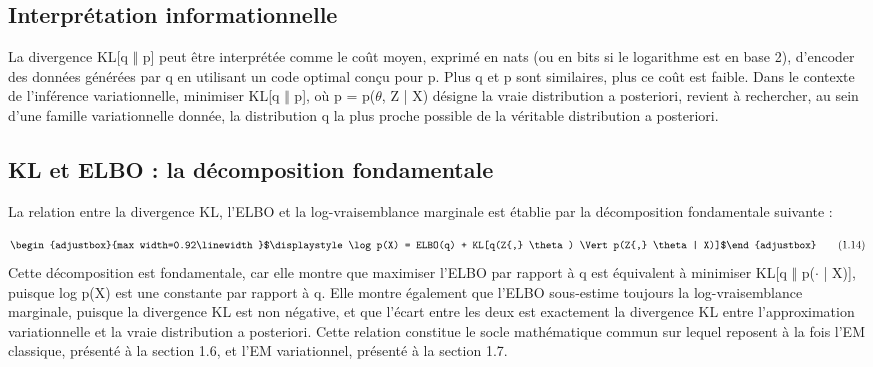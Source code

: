 \subsection{Interprétation informationnelle}
La divergence KL[q $\Vert $ p] peut être interprétée comme le coût moyen, exprimé en nats (ou en bits si le logarithme est en base 2), d'encoder des données générées par q en utilisant un code optimal conçu pour p. Plus q et p sont similaires, plus ce coût est faible. Dans le contexte de l'inférence variationnelle, minimiser KL[q $\Vert $ p], où p = p($\theta $, Z | X) désigne la vraie distribution a posteriori, revient à rechercher, au sein d'une famille variationnelle donnée, la distribution q la plus proche possible de la véritable distribution a posteriori.

\subsection{KL et ELBO : la décomposition fondamentale}
La relation entre la divergence KL, l'ELBO et la log-vraisemblance marginale est établie par la décomposition fondamentale suivante :

\begin{equation}
\begin{adjustbox}{max width=0.92\linewidth}$\displaystyle \log  p(X) = ELBO(q) + KL[q(Z{,} \theta ) \Vert  p(Z{,} \theta  | X)]$\end{adjustbox}
\tag{1.14}
\label{eq:1_14}
\end{equation}
Cette décomposition est fondamentale, car elle montre que maximiser l'ELBO par rapport à q est équivalent à minimiser KL[q $\Vert $ p($\cdot $ | X)], puisque log p(X) est une constante par rapport à q. Elle montre également que l'ELBO sous-estime toujours la log-vraisemblance marginale, puisque la divergence KL est non négative, et que l'écart entre les deux est exactement la divergence KL entre l'approximation variationnelle et la vraie distribution a posteriori. Cette relation constitue le socle mathématique commun sur lequel reposent à la fois l'EM classique, présenté à la section 1.6, et l'EM variationnel, présenté à la section 1.7.

